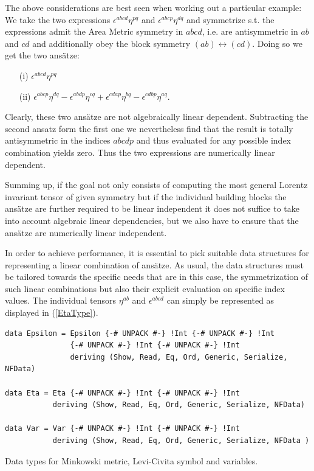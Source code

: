 \documentclass[a4paper,12pt, DIV=14, BCOR=5mm, twoside, headsepline, numbers=noenddot]{scrbook}
\begin{document}
The above considerations are best seen when working out a particular example: We take the two expressions $\epsilon^{abcd} \eta^{pq}$ and $\epsilon^{abcp} \eta^{dq}$ and symmetrize s.t. the expressions admit the Area Metric symmetry in $abcd$, i.e. are antisymmetric in $ab$ and $cd$ and additionally obey the block symmetry $(ab) \leftrightarrow (cd)$. Doing so we get the two ansätze: 
\begin{itemize}
\item[(i)] $\epsilon^{abcd} \eta^{pq}$ 
\item[(ii)] $\epsilon^{abcp} \eta^{dq} - \epsilon^{abdp} \eta^{cq} + \epsilon^{cdap} \eta^{bq} - \epsilon^{cdbp} \eta^{aq}$.
\end{itemize}
Clearly, these two ansätze are not algebraically linear dependent. Subtracting the second ansatz form the first one we nevertheless find that the result is totally antisymmetric in the indices $abcdp$ and thus evaluated for any possible index combination yields zero. Thus the two expressions are numerically linear dependent.

Summing up, if the goal not only consists of computing the most general Lorentz invariant tensor of given symmetry but if the individual building blocks the ansätze are further required to be linear independent it does not suffice to take into account algebraic linear dependencies, but we also have to ensure that the ansätze are numerically linear independent.  

In order to achieve performance, it is essential to pick suitable data structures for representing a linear combination of ansätze. As usual, the data structures must be tailored towards the specific needs that are in this case, the symmetrization of such linear combinations but also their explicit evaluation on specific index values.  
The individual tensors $\eta^{ab}$ and $\epsilon^{abcd}$ can simply be represented as displayed in (\ref{EtaType}).

\begin{listing}[hbt!] 
\begin{verbatim}
data Epsilon = Epsilon {-# UNPACK #-} !Int {-# UNPACK #-} !Int
               {-# UNPACK #-} !Int {-# UNPACK #-} !Int
               deriving (Show, Read, Eq, Ord, Generic, Serialize, NFData)

data Eta = Eta {-# UNPACK #-} !Int {-# UNPACK #-} !Int 
           deriving (Show, Read, Eq, Ord, Generic, Serialize, NFData)

data Var = Var {-# UNPACK #-} !Int {-# UNPACK #-} !Int 
           deriving (Show, Read, Eq, Ord, Generic, Serialize, NFData )
\end{verbatim} 
\caption{Data types for Minkowski metric, Levi-Civita symbol and variables.}\label{EtaType}
\end{listing}
\end{document}
